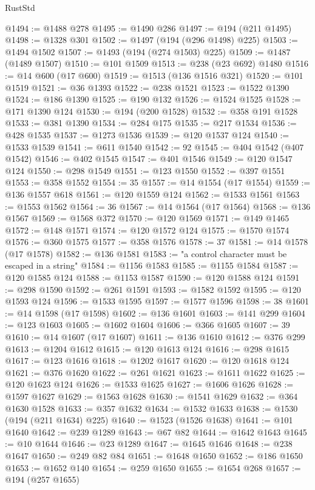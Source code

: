 \begin{lexlean}{RustStd}
\begin{coremodule}
@1494 := @1488 @278
@1495 := @1490 @286
@1497 := @194 (@211 @1495)
@1498 := @1328 @301
@1502 := @1497 (@194 (@296 @1498) @225)
@1503 := @1494 @1502
@1507 := @1493 (@194 (@274 @1503) @225)
@1509 := @1487 (@1489 @1507)
@1510 := @101 @1509
@1513 := @238 (@23 @692) @1480
@1516 := @14 @600 (@17 @600)
@1519 := @1513 (@136 @1516 @321)
@1520 := @101 @1519
@1521 := @36 @1393
@1522 := @238 @1521
@1523 := @1522 @1390
@1524 := @186 @1390
@1525 := @190 @132
@1526 := @1524 @1525
@1528 := @171 @1390 @124
@1530 := @194 (@200 @1528)
@1532 := @358 @191 @1528
@1533 := @381 @1390
@1534 := @284 @175
@1535 := @217 @1534
@1536 := @428 @1535
@1537 := @1273 @1536
@1539 := @120 @1537 @124
@1540 := @1533 @1539
@1541 := @611 @1540
@1542 := 92
@1545 := @404 @1542 (@407 @1542)
@1546 := @402 @1545
@1547 := @401 @1546
@1549 := @120 @1547 @124
@1550 := @298 @1549
@1551 := @123 @1550
@1552 := @397 @1551
@1553 := @358 @1552
@1554 := 35
@1557 := @14 @1554 (@17 @1554)
@1559 := @136 @1557 @618
@1561 := @120 @1559 @124
@1562 := @1533 @1561
@1563 := @1553 @1562
@1564 := 36
@1567 := @14 @1564 (@17 @1564)
@1568 := @136 @1567
@1569 := @1568 @372
@1570 := @120 @1569
@1571 := @149 @1465
@1572 := @148 @1571
@1574 := @120 @1572 @124
@1575 := @1570 @1574
@1576 := @360 @1575
@1577 := @358 @1576
@1578 := 37
@1581 := @14 @1578 (@17 @1578)
@1582 := @136 @1581
@1583 := "a control character must be escaped in a string"
@1584 := @1156 @1583
@1585 := @1155 @1584
@1587 := @120 @1585 @124
@1588 := @1153 @1587
@1590 := @120 @1588 @124
@1591 := @298 @1590
@1592 := @261 @1591
@1593 := @1582 @1592
@1595 := @120 @1593 @124
@1596 := @1533 @1595
@1597 := @1577 @1596
@1598 := 38
@1601 := @14 @1598 (@17 @1598)
@1602 := @136 @1601
@1603 := @141 @299
@1604 := @123 @1603
@1605 := @1602 @1604
@1606 := @366 @1605
@1607 := 39
@1610 := @14 @1607 (@17 @1607)
@1611 := @136 @1610
@1612 := @376 @299
@1613 := @1204 @1612
@1615 := @120 @1613 @124
@1616 := @298 @1615
@1617 := @123 @1616
@1618 := @1202 @1617
@1620 := @120 @1618 @124
@1621 := @376 @1620
@1622 := @261 @1621
@1623 := @1611 @1622
@1625 := @120 @1623 @124
@1626 := @1533 @1625
@1627 := @1606 @1626
@1628 := @1597 @1627
@1629 := @1563 @1628
@1630 := @1541 @1629
@1632 := @364 @1630 @1528
@1633 := @357 @1632
@1634 := @1532 @1633
@1638 := @1530 (@194 (@211 @1634) @225)
@1640 := @1523 (@1526 @1638)
@1641 := @101 @1640
@1642 := @239 @1289
@1643 := @67 @82
@1644 := @1642 @1643
@1645 := @10 @1644
@1646 := @23 @1289
@1647 := @1645 @1646
@1648 := @238 @1647
@1650 := @249 @82 @84
@1651 := @1648 @1650
@1652 := @186 @1650
@1653 := @1652 @140
@1654 := @259 @1650
@1655 := @1654 @268
@1657 := @194 (@257 @1655)

\end{coremodule}
\end{lexlean}
